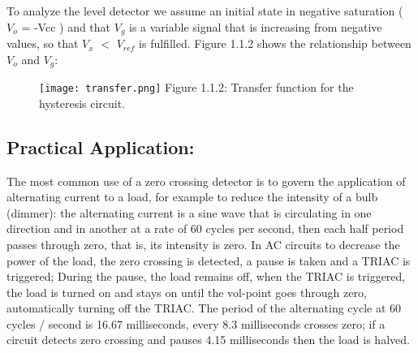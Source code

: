\pagebreak

To analyze the level detector we assume an initial state in negative saturation ( $V_{o}$ = -Vcc ) and that $V_{g}$ is a variable signal that is increasing from negative values, so that $V_{x}$ $<$ $V_{ref}$ is fulfilled. Figure 1.1.2 shows the relationship between $V_{o}$ and $V_{g}$: \hfill \break

\begin{figure}[H]
\texttt{[image: transfer.png]}
\centering \linebreak \linebreak Figure 1.1.2: Transfer function for the hysteresis circuit.
\end{figure} \hfill

\subsection{Practical Application:}

The most common use of a zero crossing detector is to govern the application of alternating current to a load, for example to reduce the intensity of a bulb (dimmer): the alternating current is a sine wave that is circulating in one direction and in another at a rate of 60 cycles per second, then each half period passes through zero, that is, its intensity is zero. In AC circuits to decrease the power of the load, the zero crossing is detected, a pause is taken and a TRIAC is triggered; During the pause, the load remains off, when the TRIAC is triggered, the load is turned on and stays on until the vol-point goes through zero, automatically turning off the TRIAC. The period of the alternating cycle at 60 cycles / second is 16.67 milliseconds, every 8.3 milliseconds crosses zero; if a circuit detects zero crossing and pauses 4.15 milliseconds then the load is halved.

\pagebreak
